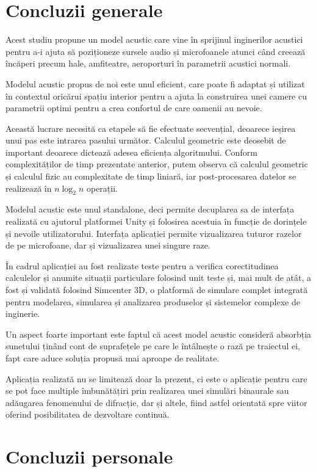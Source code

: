 \section{Concluzii generale}	
	
	Acest studiu propune un model acustic care vine în sprijinul inginerilor acustici pentru a-i ajuta să poziționeze sursele audio și microfoanele atunci când creează încăperi precum hale, amfiteatre, aeroporturi în parametrii acustici normali. 
	
	Modelul acustic propus de noi este unul eficient, care poate fi adaptat și utilizat în contextul oricărui spațiu interior pentru a ajuta la construirea unei camere cu parametrii optimi pentru a crea confortul de care oamenii au nevoie.
	
	Această lucrare necesită ca etapele să fie efectuate secvențial, deoarece ieșirea unui pas este intrarea pasului următor. Calculul geometric este deosebit de important deoarece dictează adesea eficiența algoritmului. Conform complexităților de timp prezentate anterior, putem observa că calculul geometric și calculul fizic au complexitate de timp liniară, iar post-procesarea datelor se realizează în $n\log_2 n$ operații.
	
	Modelul acustic este unul standalone, deci permite decuplarea sa de interfața realizată cu ajutorul platformei Unity și folosirea acestuia în funcție de dorințele și nevoile utilizatorului. Interfața aplicației permite vizualizarea tuturor razelor de pe microfoane, dar și vizualizarea unei singure raze.
	
	În cadrul aplicației au fost realizate teste pentru a verifica corectitudinea calculelor și anumite situații particulare folosind unit teste și, mai mult de atât, a fost și validată folosind Simcenter 3D, o platformă de simulare complet integrată pentru modelarea, simularea și analizarea produselor și sistemelor complexe de inginerie.
	
	Un aspect foarte important este faptul că acest model acustic consideră absorbția sunetului ținând cont de suprafețele pe care le întâlnește o rază pe traiectul ei, fapt care aduce soluția propusă mai aproape de realitate.
	
	Aplicația realizată nu se limitează doar la prezent, ci este o aplicație pentru care se pot face multiple îmbunătățiri prin realizarea unei simulări binaurale sau adăugarea fenomenului de difracție, dar și altele, fiind astfel orientată spre viitor oferind posibilitatea de dezvoltare continuă.
	
	
\section{Concluzii personale}
	
